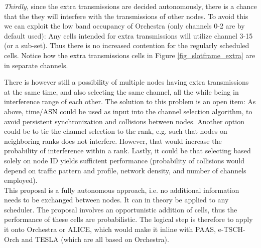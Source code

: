 \documentclass[journal,comsoc]{IEEEtran}
\begin{document}
\textit{Thirdly}, since the extra transmissions are decided autonomously, there is a chance that the they will interfere with the transmissions of other nodes. To avoid this we can exploit the low band occupancy of Orchestra (only channels 0-2 are by default used): Any cells intended for extra transmissions will utilize channel 3-15 (or a sub-set). Thus there is no increased contention for the regularly scheduled cells. Notice how the extra transmissions cells in Figure \ref{fig_slotframe_extra} are in separate channels.

There is however still a possibility of multiple nodes having extra transmissions at the same time, and also selecting the same channel, all the while being in interference range of each other. The solution to this problem is an open item: As above, time/ASN could be used as input into the channel selection algorithm, to avoid persistent synchronization and collisions between nodes. Another option could be to tie the channel selection to the rank, e.g. such that nodes on neighboring ranks does not interfere. However, that would increase the probability of interference within a rank. Lastly, it could be that selecting based solely on node ID yields sufficient performance (probability of collisions would depend on traffic pattern and profile, network density, and number of channels employed).\\

This proposal is a fully autonomous approach, i.e. no additional information needs to be exchanged between nodes. It can in theory be applied to any scheduler. The proposal involves an opportunistic addition of cells, thus the performance of these cells are probabilistic. The logical step is therefore to apply it onto Orchestra or ALICE, which would make it inline with PAAS, e-TSCH-Orch and TESLA (which are all based on Orchestra).%

\end{document}
